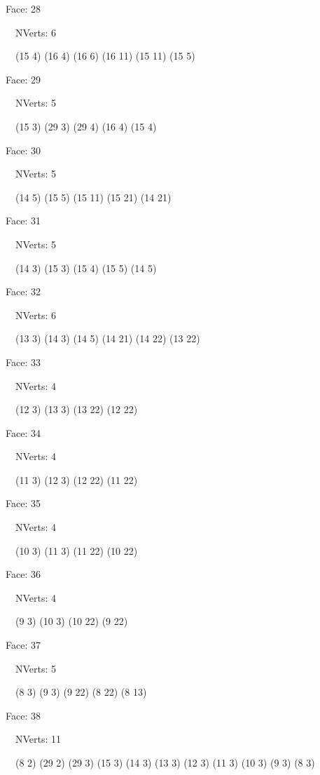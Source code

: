 \documentclass{article}
\begin{document}
{\footnotesize 

Face: 28

\   \    NVerts: 6

 \   \   (15 4) (16 4) (16 6) (16 11) (15 11) (15 5)}

{\footnotesize 

Face: 29

\   \    NVerts: 5

 \   \   (15 3) (29 3) (29 4) (16 4) (15 4)}

{\footnotesize 

Face: 30

\   \    NVerts: 5

 \   \   (14 5) (15 5) (15 11) (15 21) (14 21)}

{\footnotesize 

Face: 31

\   \    NVerts: 5

 \   \   (14 3) (15 3) (15 4) (15 5) (14 5)}

{\footnotesize 

Face: 32

\   \    NVerts: 6

 \   \   (13 3) (14 3) (14 5) (14 21) (14 22) (13 22)}

{\footnotesize 

Face: 33

\   \    NVerts: 4

 \   \   (12 3) (13 3) (13 22) (12 22)}

{\footnotesize 

Face: 34

\   \    NVerts: 4

 \   \   (11 3) (12 3) (12 22) (11 22)}

{\footnotesize 

Face: 35

\   \    NVerts: 4

 \   \   (10 3) (11 3) (11 22) (10 22)}

{\footnotesize 

Face: 36

\   \    NVerts: 4

 \   \   (9 3) (10 3) (10 22) (9 22)}

{\footnotesize 

Face: 37

\   \    NVerts: 5

 \   \   (8 3) (9 3) (9 22) (8 22) (8 13)}

{\footnotesize 

Face: 38

\   \    NVerts: 11

 \   \   (8 2) (29 2) (29 3) (15 3) (14 3) (13 3) (12 3) (11 3) (10 3) (9 3) (8 3)}
\end{document}
